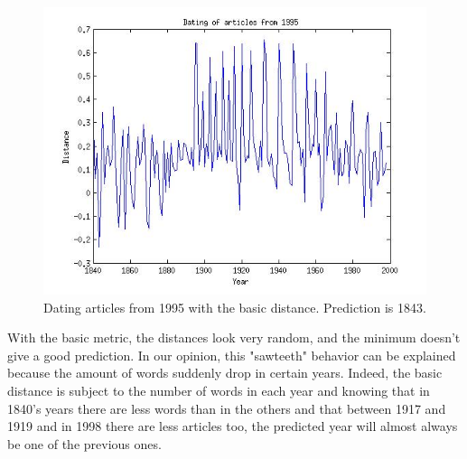 \begin{figure}[H]
\begin{minipage}[b]{0.3\linewidth}
    \end{minipage}\hfill
    \begin{minipage}[b]{0.3\linewidth}
	\includegraphics[scale=0.25]{Pictures/date_articles/distance1/dating1995_corrected.jpg}
        \caption{Dating articles from 1995 with the basic distance. Prediction is 1843.}
    \end{minipage}
\end{figure}
With the basic metric, the distances look very random, and the minimum doesn't give a good prediction. In our opinion, this "sawteeth" behavior can be explained because the amount of words suddenly drop in certain years. Indeed, the basic distance is subject to the number of words in each year and knowing that in 1840's years there are less words than in the others and that between 1917 and 1919 and in 1998 there are less articles too, the predicted year will almost always be one of the previous ones.
